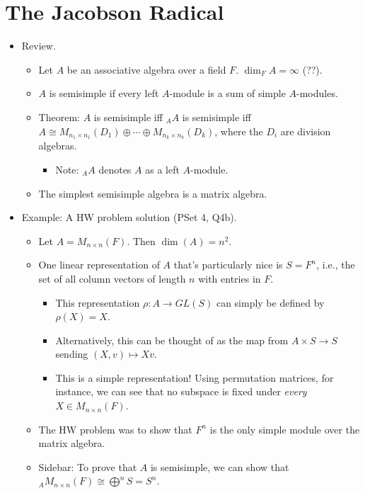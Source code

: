 \documentclass[../notes.tex]{subfiles}
\begin{document}
\section{The Jacobson Radical}
\begin{itemize}
    \item {}Review.
    \begin{itemize}
        \item Let $A$ be an associative algebra over a field $F$. $\dim_FA=\infty$ (??).
        \item $A$ is semisimple if every left $A$-module is a sum of simple $A$-modules.
        \item Theorem: $A$ is semisimple iff ${}_AA$ is semisimple iff $A\cong M_{n_1\times n_1}(D_1)\oplus\cdots\oplus M_{n_k\times n_k}(D_k)$, where the $D_i$ are division algebras.
        \begin{itemize}
            \item Note: ${}_AA$ denotes $A$ as a left $A$-module.
        \end{itemize}
        \item The simplest semisimple algebra is a matrix algebra.
    \end{itemize}
    \item Example: A HW problem solution (PSet 4, Q4b).
    \begin{itemize}
        \item Let $A=M_{n\times n}(F)$. Then $\dim(A)=n^2$.
        \item One linear representation of $A$ that's particularly nice is $S=F^n$, i.e., the set of all column vectors of length $n$ with entries in $F$.
        \begin{itemize}
            \item This representation $\rho:A\to GL(S)$ can simply be defined by $\rho(X)=X$.
            \item Alternatively, this can be thought of as the map from $A\times S\to S$ sending $(X,v)\mapsto Xv$.
            \item This is a simple representation! Using permutation matrices, for instance, we can see that no subspace is fixed under \emph{every} $X\in M_{n\times n}(F)$.
        \end{itemize}
        \item The HW problem was to show that $F^n$ is the only simple module over the matrix algebra.
        \item Sidebar: To prove that $A$ is semisimple, we can show that ${}_AM_{n\times n}(F)\cong\bigoplus^nS=S^n$.

\end{itemize}
\end{itemize}
\end{document}
